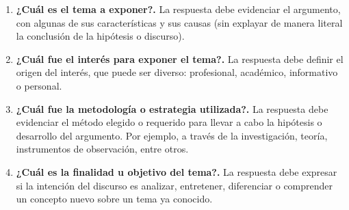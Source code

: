 \documentclass[12pt]{book}
\begin{document}
\begin{enumerate}
    \item[\HandCuffRight]{\bf ¿Cuál es el tema a exponer?.} La respuesta debe evidenciar el argumento, con algunas de sus características y sus causas (sin explayar de manera literal la conclusión de la hipótesis o discurso).
    \item[\HandCuffRight]{\bf ¿Cuál fue el interés para exponer el tema?.} La respuesta debe definir el origen del interés, que puede ser diverso: profesional, académico, informativo o personal.
    \item[\HandCuffRight]{\bf¿Cuál fue la metodología o estrategia utilizada?.} La respuesta debe evidenciar el método elegido o requerido para llevar a cabo la hipótesis o desarrollo del argumento. Por ejemplo, a través de la investigación, teoría, instrumentos de observación, entre otros.
    \item[\HandCuffRight]{\bf ¿Cuál es la finalidad u objetivo del tema?.} La respuesta debe expresar si la intención del discurso es analizar, entretener, diferenciar o comprender un concepto nuevo sobre un tema ya conocido.
\end{enumerate}
\end{document}
